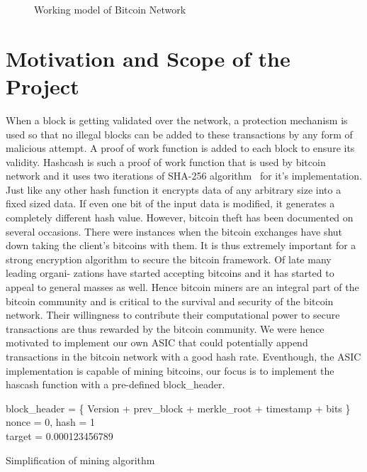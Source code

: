 \begin{figure}[ht]
	\begin{center}
	\end{center}
	\vspace{-1ex}
	\caption{ Working model of Bitcoin Network 
		\label{Working of Bitcoin Network}}
	\vspace{-4ex}
\end{figure}

\section{Motivation and Scope of the Project}
When a block is getting validated over the network, a protection mechanism is used so that no illegal blocks can be added to these transactions by any form of malicious attempt. A proof of work function is added to each block to ensure its validity. Hashcash is such a proof of work function that is used by bitcoin network and it uses two iterations of SHA-256 algorithm ~\cite{SHA-256}for it's implementation. Just like any other hash function it encrypts data of any arbitrary size into a fixed sized data. If even one bit of the input data is modified, it generates a completely different hash value.
However, bitcoin theft has been documented on several
occasions. There were instances when the bitcoin exchanges
have shut down taking the client’s bitcoins with them. It is
thus extremely important for a strong encryption algorithm to
secure the bitcoin framework. Of late many leading organi-
zations have started accepting bitcoins and it has started to
appeal to general masses as well. Hence bitcoin miners are an integral part of the bitcoin community and is critical to the survival and security of the bitcoin network. Their willingness to contribute their computational power to secure transactions are thus rewarded by the bitcoin community. We were hence motivated to implement our own ASIC that could potentially append transactions in the bitcoin network with a good hash rate.   
Eventhough, the ASIC implementation is capable of mining bitcoins, our focus is to implement the hascash function with a pre-defined block\_header.

\begin{algorithm}[hbt]
	
	{
	block\_header = \{ Version + prev\_block + merkle\_root + timestamp + bits \} \\
			nonce = 0, 	hash = 1\\
	target = 0.000123456789\\
	}
	\caption {Simplification of mining algorithm}
	\label{mining}
\end{algorithm}

